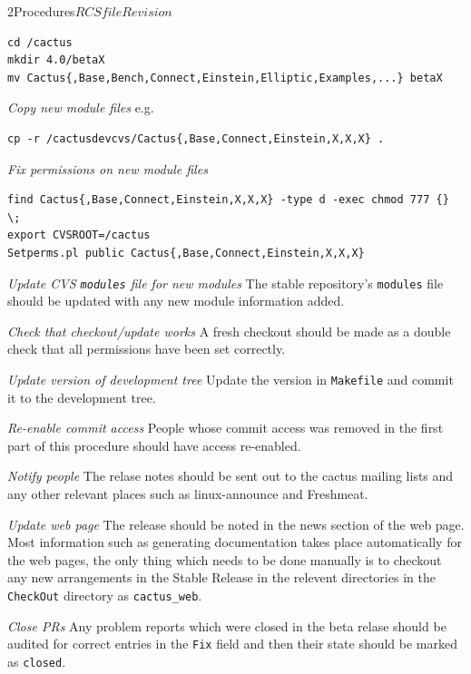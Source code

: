 \begin{cactuspart}{2}{Procedures}{$RCSfile$}{$Revision$}
\begin{Lentry}
\begin{verbatim}
cd /cactus
mkdir 4.0/betaX
mv Cactus{,Base,Bench,Connect,Einstein,Elliptic,Examples,...} betaX
\end{verbatim}

\item[{\em Copy new module files}]
e.g.
\begin{verbatim}
cp -r /cactusdevcvs/Cactus{,Base,Connect,Einstein,X,X,X} .
\end{verbatim}
\item[{\em Fix permissions on new module files}]
\begin{verbatim}
find Cactus{,Base,Connect,Einstein,X,X,X} -type d -exec chmod 777 {} \;
export CVSROOT=/cactus
Setperms.pl public Cactus{,Base,Connect,Einstein,X,X,X}
\end{verbatim}
\item[{\em Update CVS {\tt modules} file for new modules}]
The stable repository's {\tt modules} file should be updated with any
new module information added. 
\item[{\em Check that checkout/update works}]
A fresh checkout should be made as a double check that all permissions 
have been set correctly.
\item[{\em Update version of development tree}]
Update the version in {\tt Makefile} and commit it to the development
tree.
\item[{\em Re-enable commit access}]
People whose commit access was removed in the first part of this
procedure should have access re-enabled.
\item[{\em Notify people}]
The relase notes should be sent out to the cactus mailing lists and
any other relevant places such as linux-announce and Freshmeat.
\item[{\em Update web page}]
The release should be noted in the news section of the web page.
Most information such as generating documentation takes place automatically 
for the web pages, the only thing which needs to be done manually is to
checkout any new arrangements in the Stable Release in the relevent 
directories in the {\tt CheckOut} directory as {\tt cactus\_web}.
\item[{\em Close PRs}]
Any problem reports which were closed in the beta relase should be
audited for correct entries in the {\tt Fix} field and then their
state should be marked as {\tt closed}.
\end{Lentry}


\end{cactuspart}

